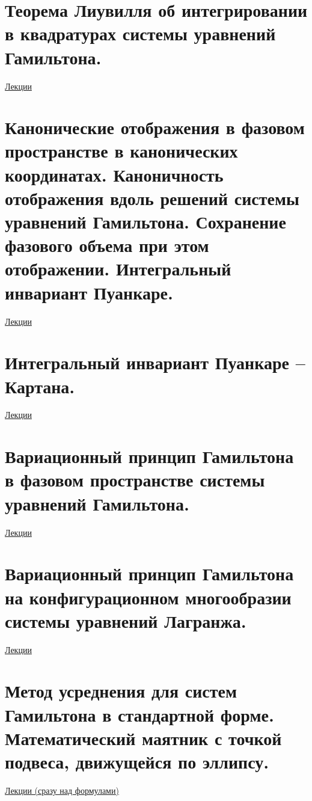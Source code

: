 \documentclass[specialist, subf, href, colorlinks=true, 12pt, times, mtpro, final]{disser}
\theoremstyle{definition}
\begin{document}
    \section{Теорема Лиувилля об интегрировании в квадратурах системы уравнений Гамильтона.}
     \label{21}
    \hyperlink {lects.37}{Лекции} \\
    
    \section{Канонические отображения в фазовом пространстве в канонических координатах. Каноничность отображения вдоль решений системы уравнений Гамильтона. Сохранение фазового объема при этом отображении. Интегральный инвариант Пуанкаре.}
     \label{22}
	\hyperlink {lects.39}{Лекции} \\
    
    \section{Интегральный инвариант Пуанкаре – Картана.}
     \label{23}
    \hyperlink {lects.42}{Лекции} \\
    
    \section{Вариационный принцип Гамильтона в фазовом пространстве системы уравнений Гамильтона.}
     \label{24}
    \hyperlink {lects.44}{Лекции} \\
    
    \section{Вариационный принцип Гамильтона на конфигурационном многообразии системы уравнений Лагранжа.}
     \label{25}
    \hyperlink {lects.45}{Лекции} \\
    
    \section{Метод усреднения для систем Гамильтона в стандартной форме. Математический маятник с точкой подвеса, движущейся по эллипсу.}
     \label{26}
    \hyperlink {lects.47}{Лекции (сразу над формулами)} \\
    
    
    
\end{document}
